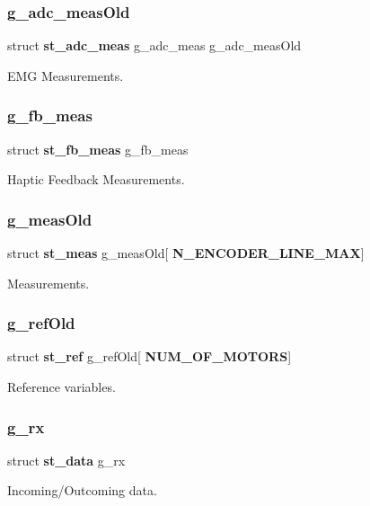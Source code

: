 \subsubsection{g\+\_\+adc\+\_\+meas\+Old}
{\footnotesize\ttfamily struct \textbf{ st\+\_\+adc\+\_\+meas} g\+\_\+adc\+\_\+meas g\+\_\+adc\+\_\+meas\+Old}

E\+MG Measurements. \mbox{\label{globals_8h_af8d2d84570b7e85614e0455a23177e62}} 
\subsubsection{g\+\_\+fb\+\_\+meas}
{\footnotesize\ttfamily struct \textbf{ st\+\_\+fb\+\_\+meas} g\+\_\+fb\+\_\+meas}

Haptic Feedback Measurements. \mbox{\label{globals_8h_a7b175385b2b9418fa7159c72d0f470fd}} 
\subsubsection{g\+\_\+meas\+Old}
{\footnotesize\ttfamily struct \textbf{ st\+\_\+meas} g\+\_\+meas\+Old[\textbf{ N\+\_\+\+E\+N\+C\+O\+D\+E\+R\+\_\+\+L\+I\+N\+E\+\_\+\+M\+AX}]}

Measurements. \mbox{\label{globals_8h_aab927f8d9bc1a835daed821aa97b9335}} 
\subsubsection{g\+\_\+ref\+Old}
{\footnotesize\ttfamily struct \textbf{ st\+\_\+ref} g\+\_\+ref\+Old[\textbf{ N\+U\+M\+\_\+\+O\+F\+\_\+\+M\+O\+T\+O\+RS}]}

Reference variables. \mbox{\label{globals_8h_aa963ce8fafc11e104eb7ee22982d0345}} 
\subsubsection{g\+\_\+rx}
{\footnotesize\ttfamily struct \textbf{ st\+\_\+data} g\+\_\+rx}

Incoming/\+Outcoming data. \mbox{\label{globals_8h_a1e6fda88dfdabc63859f8907eb702920}} 
